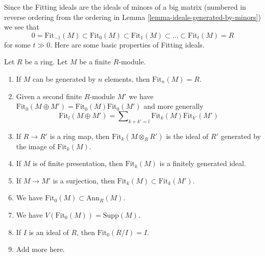 \noindent
Since the Fitting ideals are the ideals of minors of a big matrix
(numbered in reverse ordering from the ordering in
Lemma \ref{lemma-ideals-generated-by-minors})
we see that
$$
0 = \text{Fit}_{-1}(M) \subset \text{Fit}_0(M) \subset \text{Fit}_1(M)
\subset \ldots \subset \text{Fit}_t(M) = R
$$
for some $t \gg 0$. Here are some basic properties of Fitting ideals.

\begin{lemma}
\label{lemma-fitting-ideal-basics}
Let $R$ be a ring. Let $M$ be a finite $R$-module.
\begin{enumerate}
\item If $M$ can be generated by $n$ elements, then
$\text{Fit}_n(M) = R$.
\item Given a second finite $R$-module $M'$ we have
$\text{Fit}_0(M \oplus M') = \text{Fit}_0(M)\text{Fit}_0(M')$ and
more generally
$$
\text{Fit}_l(M \oplus M') =
\sum\nolimits_{k + k' = l} \text{Fit}_k(M)\text{Fit}_{k'}(M')
$$
\item If $R \to R'$ is a ring map, then $\text{Fit}_k(M \otimes_R R')$
is the ideal of $R'$ generated by the image of $\text{Fit}_k(M)$.
\item If $M$ is of finite presentation, then $\text{Fit}_k(M)$
is a finitely generated ideal.
\item If $M \to M'$ is a surjection, then
$\text{Fit}_k(M) \subset \text{Fit}_k(M')$.
\item We have $\text{Fit}_0(M) \subset \text{Ann}_R(M)$.
\item We have $V(\text{Fit}_0(M)) = \text{Supp}(M)$.
\item If $I$ is an ideal of $R$, then $\text{Fit}_0(R/I) = I$.
\item Add more here.
\end{enumerate}
\end{lemma}

